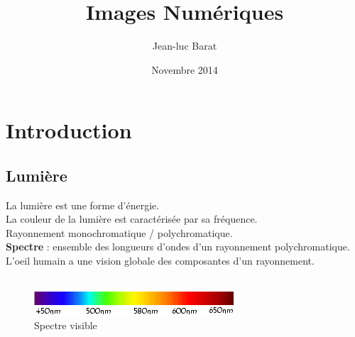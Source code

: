 \documentclass[14pt]{beamer}
\title{Images Numériques}
\author{Jean-luc Barat}
\date{Novembre 2014}
\begin{document}
\maketitle


\begin{frame}[shrink]{\secname} %
    \tableofcontents[subsectionstyle=hide]
\end{frame}


\section{Introduction}


\subsection{Lumière}
\begin{frame}{\subsecname}
    La lumière est une forme d'énergie.\\
    La couleur de la lumière est caractérisée par sa fréquence.\\
    Rayonnement monochromatique / polychromatique.\\
    \textbf{Spectre} : ensemble des longueurs d'ondes d'un rayonnement polychromatique.\\
    L'oeil humain a une vision globale des composantes d'un rayonnement.\\
    ~\\
    \begin{figure}
    \centering
    \includegraphics{spectre_visible}
    \caption{Spectre visible}
    \end{figure}
\end{frame}
\end{document}
